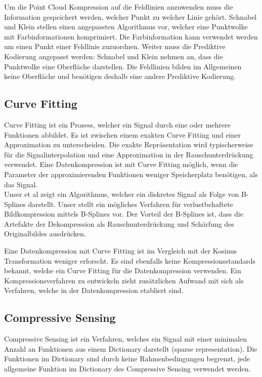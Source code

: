 Um die Point Cloud Kompression auf die Feldlinien anzuwenden muss die Information gespeichert werden, welcher Punkt zu welcher Linie gehört. Schnabel und Klein stellen einen angepassten Algorithmus vor, welcher eine Punktwolke mit Farbinformationen komprimiert. Die Farbinformation kann verwendet werden um einen Punkt einer Feldlinie zuzuordnen. Weiter muss die Prediktive Kodierung angepasst werden: Schnabel und Klein nehmen an, dass die Punktwolke eine Oberfläche darstellen. Die Feldlinien bilden im Allgemeinen keine Oberfläche und benötigen deshalb eine andere Prediktive Kodierung.

\subsection{Curve Fitting}
Curve Fitting ist ein Prozess, welcher ein Signal durch eine oder mehrere Funktionen abbildet. Es ist zwischen einem exakten Curve Fitting und einer Approximation zu unterscheiden. Die exakte Repräsentation wird typischerweise für die Signalinterpolation und eine Approximation in der Rauschunterdrückung verwendet. Eine Datenkompression ist mit Curve Fitting möglich, wenn die Parameter der approximierenden Funktionen weniger Speicherplatz benötigen, als das Signal.\\
Unser et al \cite{unser1993b:spline} zeigt ein Algorithmus, welcher ein diskretes Signal als Folge von B-Splines darstellt. Unser stellt ein mögliches Verfahren für verlustbehaftete Bildkompression mittels B-Splines vor\cite{unser1993b2:spline}. Der Vorteil der B-Splines ist, dass die Artefakte der Dekompression als Rauschunterdrückung und Schärfung des Originalbildes ausdrücken.

Eine Datenkompression mit Curve Fitting ist im Vergleich mit der Kosinus Transformation weniger erforscht. Es sind ebenfalls keine Kompressionsstandards bekannt, welche ein Curve Fitting für die Datenkompression verwenden. Ein Kompressionsverfahren zu entwickeln zieht zusätzlichen Aufwand mit sich als Verfahren, welche in der Datenkompression etabliert sind.

\subsection{Compressive Sensing}
Compressive Sensing ist ein Verfahren, welches ein Signal mit einer minimalen Anzahl an Funktionen aus einem Dictionary darstellt (sparse representation).  Die Funktionen im Dictionary sind durch keine Rahmenbedingungen begrenzt, jede allgemeine Funktion im Dictionary des Compressive Sensing verwendet werden. 

